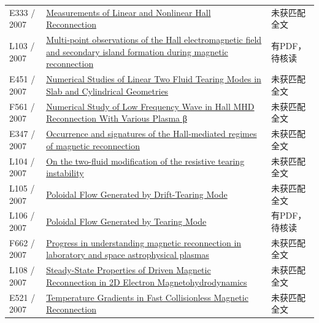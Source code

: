 \documentclass[UTF8,a4paper,11pt,openany,fontset=fandol]{ctexbook}
\begin{document}
\begin{longtable}{P{24mm}P{97mm}P{27mm}}
E333 / 2007 & \href{http://absimage.aps.org/image/DPP07/MWS_DPP07-2007-001493.pdf}{Measurements of Linear and Nonlinear Hall Reconnection} & 未获匹配全文\\

L103 / 2007 & \href{https://doi.org/10.1029/2006ja012158}{Multi‐point observations of the Hall electromagnetic field and secondary island formation during magnetic reconnection} & 有PDF，待核读\\

E451 / 2007 & \href{http://absimage.aps.org/image/DPP07/MWS_DPP07-2007-001372.pdf}{Numerical Studies of Linear Two Fluid Tearing Modes in Slab and Cylindrical Geometries} & 未获匹配全文\\

F561 / 2007 & \href{https://doi.org/10.11728/cjss2007.02.096}{Numerical Study of Low Frequency Wave in Hall MHD Reconnection With Various Plasma β} & 未获匹配全文\\

E347 / 2007 & \href{https://ui.adsabs.harvard.edu/abs/2007AGUSMSM54A..05V/abstract}{Occurrence and signatures of the Hall-mediated regimes of magnetic reconnection} & 未获匹配全文\\

L104 / 2007 & \href{https://doi.org/10.1063/1.2759893}{On the two-fluid modification of the resistive tearing instability} & 未获匹配全文\\

L105 / 2007 & \href{https://doi.org/10.1143/jpsj.77.014501}{Poloidal Flow Generated by Drift-Tearing Mode} & 未获匹配全文\\

L106 / 2007 & \href{https://doi.org/10.15017/26835}{Poloidal Flow Generated by Tearing Mode} & 有PDF，待核读\\

F662 / 2007 & \href{https://doi.org/10.1063/1.2740595}{Progress in understanding magnetic reconnection in laboratory and space astrophysical plasmas} & 未获匹配全文\\

L108 / 2007 & \href{https://doi.org/10.1103/physrevlett.99.235001}{Steady-State Properties of Driven Magnetic Reconnection in 2D Electron Magnetohydrodynamics} & 未获匹配全文\\

E521 / 2007 & \href{https://doi.org/10.1103/physrevlett.98.265002}{Temperature Gradients in Fast Collisionless Magnetic Reconnection} & 未获匹配全文\\


\end{longtable}
\end{document}
